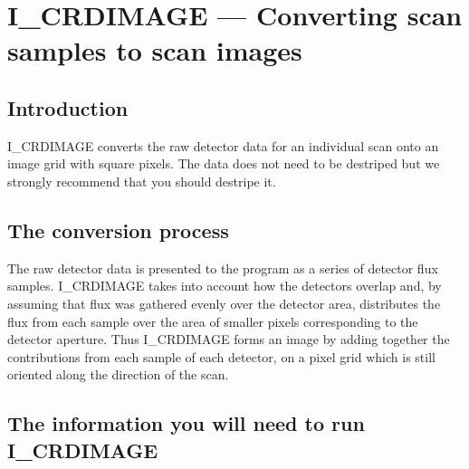 \documentclass[nolof,noabs,11pt]{starlink}
\begin{document}
\pagebreak

\section{I\_CRDIMAGE --- Converting scan samples to scan images}

\subsection{Introduction}

I\_CRDIMAGE  converts the raw detector data for an individual scan
onto an image grid with square pixels. The data does not need to be destriped
but we strongly recommend that you should destripe it.

\subsection{The conversion process}

The raw detector data is presented to the program as a series of detector flux
samples. I\_CRDIMAGE takes into account how the detectors
overlap and, by assuming that flux was gathered evenly over the detector area,
distributes the flux from each sample over the area of smaller pixels
corresponding to the detector aperture. Thus I\_CRDIMAGE forms an image by
adding together the contributions from each sample of each detector, on a pixel
grid which is still oriented along the direction of the scan.

\subsection{The information you will need to run I\_CRDIMAGE}
\end{document}
